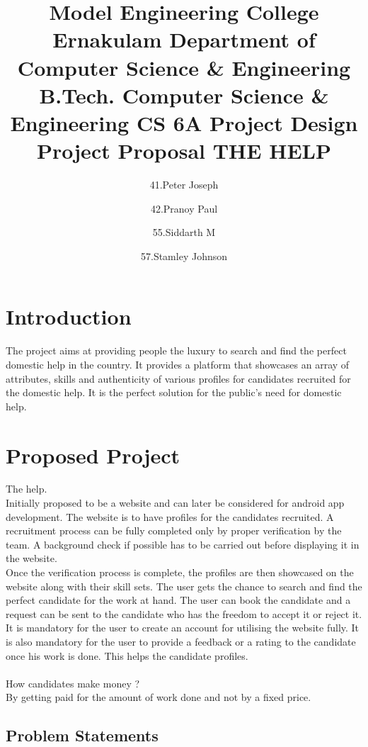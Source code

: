 \documentclass[a4paper]{article}
\title{Model Engineering College Ernakulam \linebreak 
Department of Computer Science \& Engineering \linebreak
B.Tech. Computer Science \& Engineering \linebreak
CS 6A Project Design \linebreak
Project Proposal \linebreak
THE HELP}
\author{41.Peter Joseph \and 42.Pranoy Paul \and 55.Siddarth M \and 57.Stamley Johnson}
\begin{document}
\maketitle



\section{Introduction}

The project aims at providing people the luxury to search and find the perfect domestic help in the country.
It provides a platform that showcases an array of attributes, skills and authenticity of various profiles for candidates recruited for the domestic help.
It is the perfect solution for the public's need for domestic help. 

\section{Proposed Project}

The help.\\
Initially proposed to be a website and can later be considered for android app development. 
The website is to have profiles for the candidates recruited. 
A recruitment process can be fully completed only by proper verification by the team. A background check if possible has to be carried out before displaying it in
the website.\\
Once the verification process is complete, the profiles are then showcased on the website along with their skill sets. 
The user gets the chance to search and find the perfect candidate for the work at hand. 
The user can book the candidate and a request can be sent to the candidate who has the freedom to accept it or reject it.\\
It is mandatory for the user to create an account for utilising the website fully. 
It is also mandatory for the user to provide a feedback or a rating to the candidate once his work is done. This helps the candidate profiles.\\ \\
How candidates make money ?\\
By getting paid for the amount of work done and not by a fixed price.

\subsection{Problem Statements}
\end{document}
